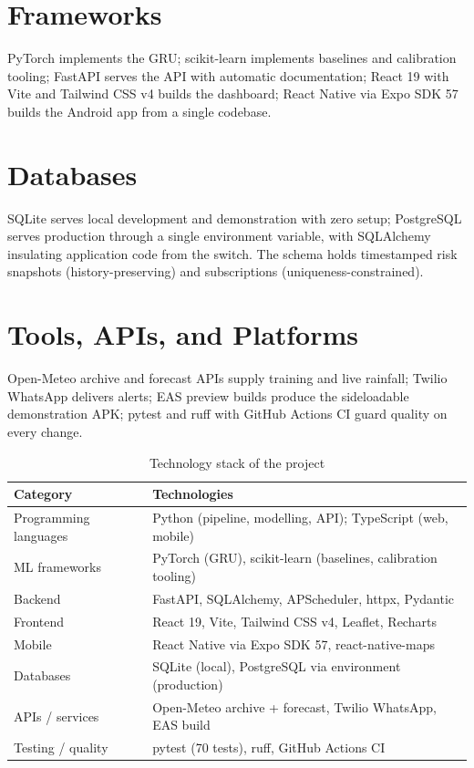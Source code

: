 \documentclass[a4paper,12pt]{report}
\begin{document}
\section{Frameworks}
PyTorch implements the GRU; scikit-learn implements baselines and calibration tooling; FastAPI serves the API with automatic documentation; React 19 with Vite and Tailwind CSS v4 builds the dashboard; React Native via Expo SDK 57 builds the Android app from a single codebase.

\section{Databases}
SQLite serves local development and demonstration with zero setup; PostgreSQL serves production through a single environment variable, with SQLAlchemy insulating application code from the switch. The schema holds timestamped risk snapshots (history-preserving) and subscriptions (uniqueness-constrained).

\section{Tools, APIs, and Platforms}
Open-Meteo archive and forecast APIs supply training and live rainfall; Twilio WhatsApp delivers alerts; EAS preview builds produce the sideloadable demonstration APK; pytest and ruff with GitHub Actions CI guard quality on every change.

\begin{table}[H]
\centering
\renewcommand{\arraystretch}{1.3}
\begin{tabularx}{\textwidth}{|>{\raggedright\arraybackslash}p{3.6cm}|X|}
\hline
\textbf{Category} & \textbf{Technologies} \\ \hline
Programming languages & Python (pipeline, modelling, API); TypeScript (web, mobile) \\ \hline
ML frameworks & PyTorch (GRU), scikit-learn (baselines, calibration tooling) \\ \hline
Backend & FastAPI, SQLAlchemy, APScheduler, httpx, Pydantic \\ \hline
Frontend & React 19, Vite, Tailwind CSS v4, Leaflet, Recharts \\ \hline
Mobile & React Native via Expo SDK 57, react-native-maps \\ \hline
Databases & SQLite (local), PostgreSQL via environment (production) \\ \hline
APIs / services & Open-Meteo archive + forecast, Twilio WhatsApp, EAS build \\ \hline
Testing / quality & pytest (70 tests), ruff, GitHub Actions CI \\ \hline
\end{tabularx}
\caption{Technology stack of the project}
\label{tab:stack}
\end{table}
\end{document}
